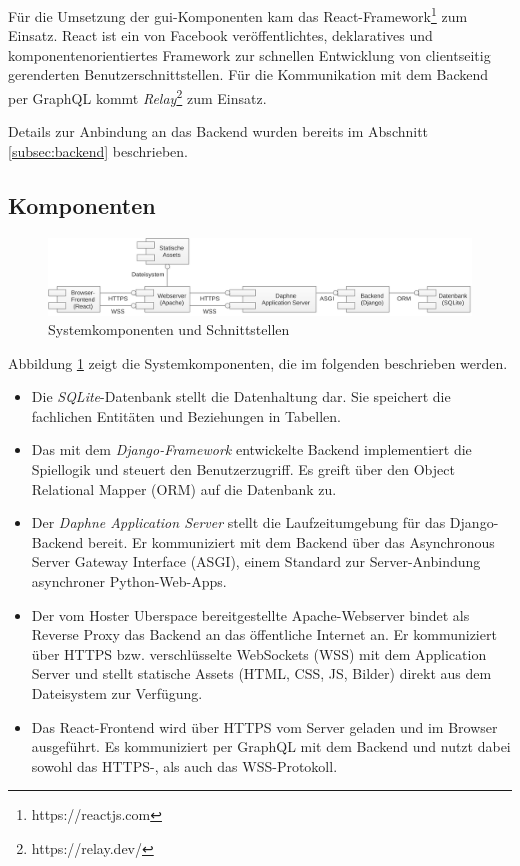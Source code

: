 \documentclass[a4paper,11pt,listof=numbered,glossary=totoc,parskip=half,toc=bib]{scrreprt}
\begin{document}
	 Für die Umsetzung der \Gls{gui}-Komponenten kam das React-Framework\footnote{https://reactjs.com} zum Einsatz. React ist ein von Facebook veröffentlichtes, deklaratives und komponentenorientiertes Framework zur schnellen Entwicklung von clientseitig gerenderten Benutzerschnittstellen. Für die Kommunikation mit dem Backend per GraphQL kommt \textit{Relay}\footnote{https://relay.dev/} zum Einsatz.
	
	Details zur Anbindung an das Backend wurden bereits im Abschnitt \ref{subsec:backend} beschrieben.	
	
	\subsection{Komponenten}
	
	
	\begin{figure}
		\centering
		\includegraphics[width=\textwidth]{deployment}
		\caption{Systemkomponenten und Schnittstellen}
		\label{fig:components}
	\end{figure}
	
	Abbildung \ref{fig:components} zeigt die Systemkomponenten, die im folgenden beschrieben werden.
	
	\begin{itemize}
		\item Die \textit{SQLite}-Datenbank stellt die Datenhaltung dar. Sie speichert die fachlichen Entitäten und Beziehungen in Tabellen.
		\item Das mit dem \textit{Django-Framework} entwickelte Backend implementiert die Spiellogik und steuert den Benutzerzugriff. Es greift über den Object Relational Mapper (ORM) auf die Datenbank zu.
		\item Der \textit{Daphne Application Server} stellt die Laufzeitumgebung für das Django-Backend bereit. Er kommuniziert mit dem Backend über das Asynchronous Server Gateway Interface (ASGI), einem Standard zur Server-Anbindung asynchroner Python-Web-Apps.
		\item Der vom Hoster Uberspace bereitgestellte Apache-Webserver bindet als Reverse Proxy das Backend an das öffentliche Internet an. Er kommuniziert über HTTPS bzw. verschlüsselte WebSockets (WSS) mit dem Application Server und stellt statische Assets (HTML, CSS, JS, Bilder) direkt aus dem Dateisystem zur Verfügung.
		\item Das React-Frontend wird über HTTPS vom Server geladen und im Browser ausgeführt. Es kommuniziert per GraphQL mit dem Backend und nutzt dabei sowohl das HTTPS-, als auch das WSS-Protokoll.
	\end{itemize}
	
\end{document}
